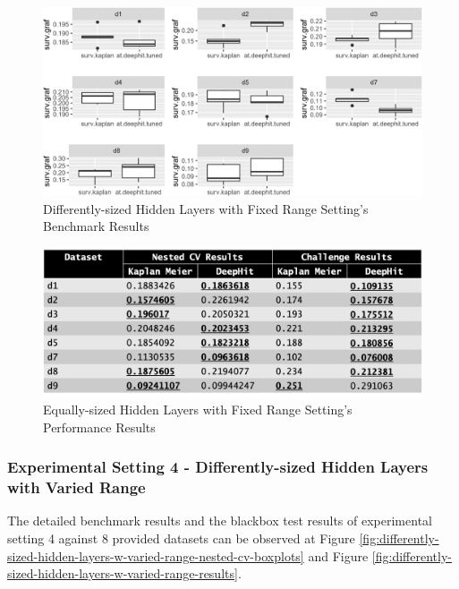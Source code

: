 \documentclass[
]{article}
\begin{document}
\begin{figure}

{\centering \includegraphics[width=0.8\linewidth]{differently-sized-hidden-layers-w-fixed-range-nested-cv-boxplots} 

}

\caption{Differently-sized Hidden Layers with Fixed Range Setting's Benchmark Results}\label{fig:differently-sized-hidden-layers-w-fixed-range-nested-cv-boxplots}
\end{figure}

\begin{figure}

{\centering \includegraphics[width=0.8\linewidth]{differently-sized-hidden-layers-w-fixed-range-results} 

}

\caption{Equally-sized Hidden Layers with Fixed Range Setting's Performance Results}\label{fig:differently-sized-hidden-layers-w-fixed-range-results}
\end{figure}

\hypertarget{ex4}{%
\subsubsection{Experimental Setting 4 - Differently-sized Hidden Layers with Varied Range}\label{ex4}}

The detailed benchmark results and the blackbox test results of experimental setting 4 against 8 provided datasets can be observed at Figure \ref{fig:differently-sized-hidden-layers-w-varied-range-nested-cv-boxplots} and Figure \ref{fig:differently-sized-hidden-layers-w-varied-range-results}.
\end{document}
